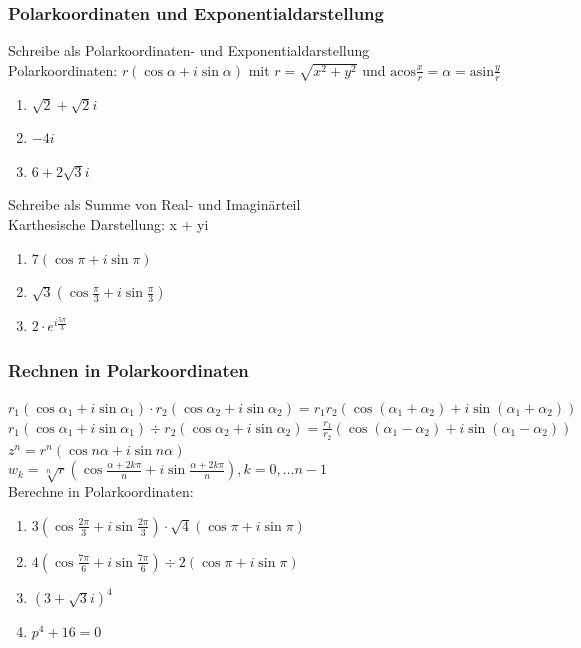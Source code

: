 \documentclass[11pt, a4paper]{article}
\newcommand{\acos}{\mathrm{acos}}
\newcommand{\asin}{\mathrm{asin}}
\begin{document}
\subsubsection{Polarkoordinaten und Exponentialdarstellung}
Schreibe als Polarkoordinaten- und Exponentialdarstellung \\
Polarkoordinaten: $r(\cos \alpha + i \sin \alpha)$ mit $r=\sqrt{x^2+y^2}$ und $\acos \frac{x}{r} = \alpha = \asin \frac{y}{r}$
\begin{enumerate}
	\item $\sqrt{2}+\sqrt{2}i$
	\item $-4i$
	\item $6+2\sqrt{3}i$
\end{enumerate}
Schreibe als Summe von Real- und Imaginärteil \\
Karthesische Darstellung: x + yi
\begin{enumerate}
	\item $7 \left( \cos \pi + i \sin \pi \right)$
	\item $\sqrt{3} \left( \cos \frac{\pi}{3} + i \sin \frac{\pi}{3} \right)$
	\item $2 \cdot e^{i \frac{5 \pi}{3}}$
\end{enumerate}

\subsubsection{Rechnen in Polarkoordinaten}
$r_1 \left( \cos \alpha_1 + i \sin \alpha_1 \right) \cdot r_2 \left( \cos \alpha_2 + i \sin \alpha_2 \right) = r_1 r_2 \left( \cos \left(\alpha_1 + \alpha_2\right) + i \sin \left(\alpha_1 + \alpha_2\right) \right)$ \\
$r_1 \left( \cos \alpha_1 + i \sin \alpha_1 \right) \div r_2 \left( \cos \alpha_2 + i \sin \alpha_2 \right) = \frac{r_1}{r_2} \left( \cos \left(\alpha_1 - \alpha_2\right) + i \sin \left(\alpha_1 - \alpha_2\right) \right)$ \\
$z^n = r^n \left( \cos n \alpha + i \sin n \alpha \right)$ \\
$w_k = \sqrt[n]{r} \left( \cos \frac{\alpha+2k\pi}{n} + i \sin \frac{\alpha+2k\pi}{n} \right), k = 0, \dots n-1$ \\
Berechne in Polarkoordinaten:
\begin{enumerate}
	\item $3 \left( \cos \frac{2\pi}{3} + i \sin \frac{2\pi}{3} \right) \cdot \sqrt{4} \left( \cos \pi + i \sin \pi \right)$
	\item $4 \left( \cos \frac{7\pi}{6} + i \sin \frac{7\pi}{6} \right) \div 2 \left( \cos \pi + i \sin \pi \right)$
	\item $\left( 3+\sqrt{3}i \right)^4$
	\item $p^4 + 16 = 0$
\end{enumerate}
\end{document}
